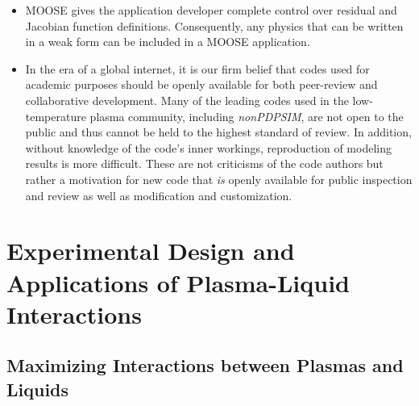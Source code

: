 \begin{itemize}
\item \label{itm:jacobian} MOOSE gives the application developer complete control over residual and Jacobian function definitions. Consequently, any physics that can be written in a weak form can be included in a MOOSE application.
\item \label{itm:open_source} In the era of a global internet, it is our firm belief that codes used for academic purposes should be openly available for both peer-review and collaborative development. Many of the leading codes used in the low-temperature plasma community, including \textit{nonPDPSIM}, are not open to the public and thus cannot be held to the highest standard of review. In addition, without knowledge of the code's inner workings, reproduction of modeling results is more difficult. These are not criticisms of the code authors but rather a motivation for new code that \textit{is} openly available for public inspection and review as well as modification and customization.
\end{itemize}

\section{Experimental Design and Applications of Plasma-Liquid Interactions}
\label{sec:intro_apps}

\subsection{Maximizing Interactions between Plasmas and Liquids}
\label{sec:intro_epxt}

